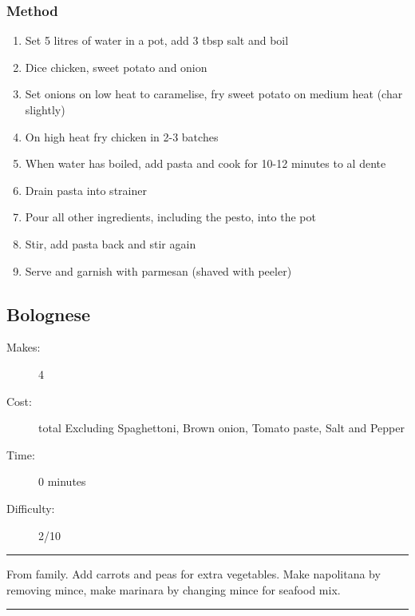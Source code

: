 \documentclass[]{article}
\begin{document}
\subsubsection*{\Large Method}
\begin{enumerate}[font=\huge\color{accent}]
	\item Set 5 litres of water in a pot, add 3 tbsp salt and boil
	\item Dice chicken, sweet potato and onion
	\item Set onions on low heat to caramelise, fry sweet potato on medium heat (char slightly)
	\item On high heat fry chicken in 2-3 batches
	\item When water has boiled, add pasta and cook for 10-12 minutes to al dente
	\item Drain pasta into strainer
	\item Pour all other ingredients, including the pesto, into the pot
	\item Stir, add pasta back and stir again
	\item Serve and garnish with parmesan (shaved with peeler)
\end{enumerate}
\newpage
{}\label{rec:Bolognese}
\subsection*{\center\huge Bolognese}
\begin{description}
\item[Makes:] 4 
\item[Cost:]  total Excluding Spaghettoni, Brown onion, Tomato paste, Salt and Pepper
\item[Time:] 0 minutes
\item[Difficulty:] 2/10
\end{description}
\vspace{0.2cm}\hrule\vspace{0.5cm}
\begin{adjustwidth}{0.5 cm}{0.5 cm}

From family. Add carrots and peas for extra vegetables. Make napolitana by removing mince, make marinara by changing mince for seafood mix. \hfill\color{accent}{\Large\faTruck\hspace{0.1cm}}\color{black}

\end{adjustwidth}
\vspace{0.5cm}\hrule
\end{document}
